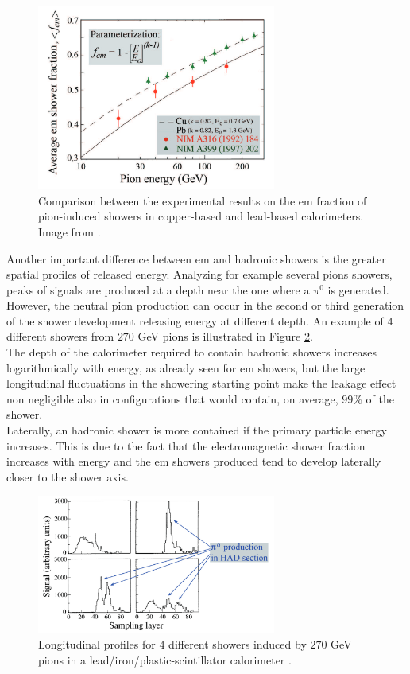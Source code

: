 \begin{figure}
	\centering
	\includegraphics[width=0.7\textwidth]{IMG/Cap2/f_em.png}
	\caption{Comparison between the experimental results on the em fraction of pion-induced showers in copper-based and lead-based calorimeters. Image from \cite{fem_par}.}
	\label{fig:f_em}
\end{figure}

Another important difference between em and hadronic showers is the greater spatial profiles of released energy. Analyzing for example several pions showers, peaks of signals are produced at a depth near the one where a $\pi^0$ is generated. However, the neutral pion production can occur in the second or third generation of the shower development releasing energy at different depth. An example of $4$ different showers from $270$ GeV pions is illustrated in Figure \ref{fig:had_start}.\\
The depth of the calorimeter required to contain hadronic showers increases logarithmically with energy, as already seen for em showers, but the large longitudinal fluctuations in the showering starting point make the leakage effect non negligible also in configurations that would contain, on average, $99\%$ of the shower.\\
Laterally, an hadronic shower is more contained if the primary particle energy increases. This is due to the fact that the electromagnetic shower fraction increases with energy and the em showers produced tend to develop laterally closer to the shower axis.
 
 \begin{figure}
	\centering
	\includegraphics[width=0.7\textwidth]{IMG/Cap2/had_start.png}
	\caption{Longitudinal  profiles  for  $4$  different  showers  induced  by  $270$ GeV pions in a lead/iron/plastic-scintillator calorimeter \cite{Wigmans_art_of_cal}.}
	\label{fig:had_start}
\end{figure}

